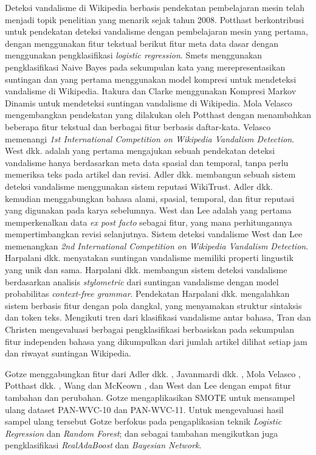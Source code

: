 Deteksi vandalisme di Wikipedia berbasis pendekatan pembelajaran mesin telah
menjadi topik penelitian yang menarik sejak tahun 2008.
Potthast \cite{potthast2008automatic} berkontribusi untuk pendekatan deteksi
vandalisme dengan pembelajaran mesin yang pertama, dengan menggunakan fitur
tekstual berikut fitur meta data dasar dengan menggunakan pengklasifikasi
\textit{logistic regression}.
Smets \cite{smets08automaticvandalism} menggunakan pengklasifikasi Naive Bayes
pada sekumpulan kata yang merepresentasikan suntingan dan yang pertama
menggunakan model kompresi untuk mendeteksi vandalisme di Wikipedia.
Itakura dan Clarke \cite{itakura2009using} menggunakan Kompresi Markov Dinamis
untuk mendeteksi suntingan vandalisme di Wikipedia.
Mola Velasco \cite{mola2012wikipedia} mengembangkan pendekatan yang dilakukan
oleh Potthast \cite{potthast2008automatic} dengan menambahkan beberapa fitur
tekstual dan berbagai fitur berbasis daftar-kata.
Velasco memenangi \textit{1st International Competition on Wikipedia Vandalism
Detection}.  West dkk. \cite{west2011multilingual} adalah yang pertama
mengajukan sebuah pendekatan deteksi vandalisme hanya berdasarkan meta data
spasial dan temporal, tanpa perlu memeriksa teks pada artikel dan revisi.
Adler dkk. \cite{adler2010detecting} membangun sebuah sistem deteksi vandalisme
menggunakan sistem reputasi WikiTrust.
Adler dkk. \cite{adler2011wikipedia} kemudian menggabungkan bahasa alami,
spasial, temporal, dan fitur reputasi yang digunakan pada karya sebelumnya.
West dan Lee \cite{west2011multilingual} adalah yang pertama memperkenalkan
data \textit{ex post facto} sebagai fitur, yang mana perhitungannya
mempertimbangkan revisi selanjutnya.
Sistem deteksi vandalisme West dan Lee memenangkan \textit{2nd International
Competition on Wikipedia Vandalism Detection}.
Harpalani dkk. \cite{harpalani2011language} menyatakan suntingan vandalisme
memiliki properti lingustik yang unik dan sama.
Harpalani dkk. membangun sistem deteksi vandalisme berdasarkan analisis
\textit{stylometric} dari suntingan vandalisme dengan model probabilitas
\textit{context-free grammar}.
Pendekatan Harpalani dkk. mengalahkan sistem berbasis fitur dengan pola
dangkal, yang menyamakan struktur sintaksis dan token teks.
Mengikuti tren dari klasifikasi vandalisme antar bahasa, Tran dan Christen
\cite{tran2013cross} mengevaluasi berbagai pengklasifikasi berbasiskan pada
sekumpulan fitur independen bahasa yang dikumpulkan dari jumlah artikel dilihat
setiap jam dan riwayat suntingan Wikipedia.

Gotze \cite{gotze2014advanced} menggabungkan fitur dari Adler dkk.
\cite{adler2011wikipedia}, Javanmardi dkk. \cite{javanmardi2011vandalism}, Mola
Velasco \cite{mola2012wikipedia}, Potthast dkk. \cite{potthast2008automatic},
Wang dan McKeown \cite{wang2010got}, dan West dan Lee
\cite{west2011multilingual} dengan empat fitur tambahan dan perubahan.
Gotze mengaplikasikan SMOTE untuk mensampel ulang dataset PAN-WVC-10 dan
PAN-WVC-11.
Untuk mengevaluasi hasil sampel ulang tersebut Gotze berfokus pada
pengaplikasian teknik \textit{Logistic Regression} dan \textit{Random Forest};
dan sebagai tambahan mengikutkan juga pengklasifikasi \textit{RealAdaBoost} dan
\textit{Bayesian Network}.

